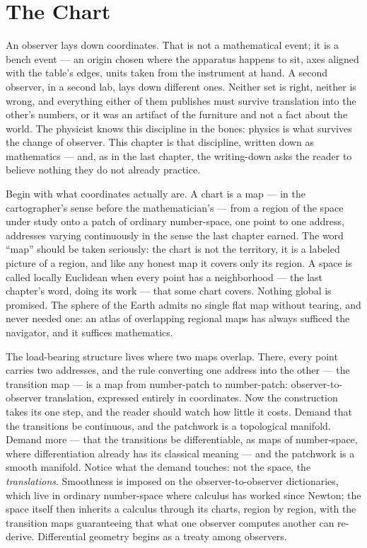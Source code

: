 \chapter{The Chart}

An observer lays down coordinates. That is not a mathematical event; it is a
bench event --- an origin chosen where the apparatus happens to sit, axes
aligned with the table's edges, units taken from the instrument at hand. A
second observer, in a second lab, lays down different ones. Neither set is
right, neither is wrong, and everything either of them publishes must
survive translation into the other's numbers, or it was an artifact of the
furniture and not a fact about the world. The physicist knows this
discipline in the bones: physics is what survives the change of observer.
This chapter is that discipline, written down as mathematics --- and, as in
the last chapter, the writing-down asks the reader to believe nothing they
do not already practice.

Begin with what coordinates actually are. A chart is a map --- in the
cartographer's sense before the mathematician's --- from a region of the
space under study onto a patch of ordinary number-space, one point to one
address, addresses varying continuously in the sense the last chapter
earned. The word ``map'' should be taken seriously: the chart is not the
territory, it is a labeled picture of a region, and like any honest map it
covers only its region. A space is called locally Euclidean when every point
has a neighborhood --- the last chapter's word, doing its work --- that some
chart covers. Nothing global is promised. The sphere of the Earth admits no
single flat map without tearing, and never needed one: an atlas of
overlapping regional maps has always sufficed the navigator, and it
suffices mathematics.

The load-bearing structure lives where two maps overlap. There, every point
carries two addresses, and the rule converting one address into the other
--- the transition map --- is a map from number-patch to number-patch:
observer-to-observer translation, expressed entirely in coordinates. Now
the construction takes its one step, and the reader should watch how little
it costs. Demand that the transitions be continuous, and the patchwork is a
topological manifold. Demand more --- that the transitions be
differentiable, as maps of number-space, where differentiation already has
its classical meaning --- and the patchwork is a smooth manifold. Notice
what the demand touches: not the space, the \emph{translations}. Smoothness
is imposed on the observer-to-observer dictionaries, which live in ordinary
number-space where calculus has worked since Newton; the space itself then
inherits a calculus through its charts, region by region, with the
transition maps guaranteeing that what one observer computes another can
re-derive. Differential geometry begins as a treaty among observers.

